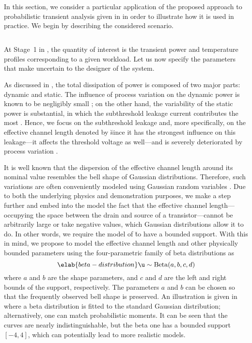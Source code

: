 In this section, we consider a particular application of the proposed approach
to probabilistic transient analysis given in  in
order to illustrate how it is used in practice. We begin by describing the
considered scenario.

\subsection{\problemtitle}

At Stage~1 in , the quantity of interest \g is the
transient power and temperature profiles corresponding to a given workload. Let
us now specify the parameters \vu that make \g uncertain to the designer of the
system.

As discussed in , the total dissipation of power is composed
of two major parts: dynamic and static. The influence of process variation on
the dynamic power is known to be negligibly small \cite{srivastava2010}; on the
other hand, the variability of the static power is substantial, in which the
subthreshold leakage current contributes the most \cite{juan2011, juan2012}.
Hence, we focus on the subthreshold leakage and, more specifically, on the
effective channel length denoted by \u since it has the strongest influence on
this leakage---it affects the threshold voltage as well---and is severely
deteriorated by process variation \cite{chandrakasan2000}.

It is well known that the dispersion of the effective channel length around its
nominal value resembles the bell shape of Gaussian distributions. Therefore,
such variations are often conveniently modeled using Gaussian random variables
\cite{bhardwaj2006, ghanta2006, huang2009a, shen2009, chandra2010,
srivastava2010, juan2011, juan2012, lee2013}. Due to both the underlying physics
and demonstration purposes, we make a step further and embed into the model the
fact that the effective channel length---occupying the space between the drain
and source of a transistor---cannot be arbitrarily large or take negative
values, which Gaussian distributions allow it to do. In other words, we require
the model of \u to have a bounded support. With this in mind, we propose to
model the effective channel length and other physically bounded parameters using
the four-parametric family of beta distributions as
\begin{equation} \elab{beta-distribution}
  \u \sim \mathrm{Beta}(a, b, c, d)
\end{equation}
where $a$ and $b$ are the shape parameters, and $c$ and $d$ are the left and
right bounds of the support, respectively. The parameters $a$ and $b$ can be
chosen so that the frequently observed bell shape is preserved. An illustration
is given in  where a beta distribution is fitted to
the standard Gaussian distribution; alternatively, one can match probabilistic
moments. It can be seen that the curves are nearly indistinguishable, but the
beta one has a bounded support $[-4, 4]$, which can potentially lead to more
realistic models.

